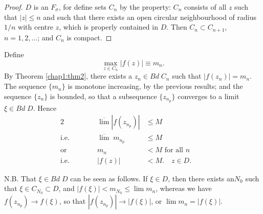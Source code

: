 \begin{proof}
$D$ is an $F_\sigma$, for define sets $C_n$ by the property: $C_n$
  consists of all $z$ such that $|z| \leq n$ and such that there
  exists an open circular neighbourhood of radius $1/n$ with centre
  $z$, which is properly contained in $D$. Then $C_n \subset C_{n+1}$,
  $n=1,2,\ldots$; and $C_n$ is compact.
\end{proof}

Define
$$
\max\limits_{z\in C_n} |f(z)| \equiv m_n.
$$
By Theorem \ref{chap1:thm2}, there exists a $z_n \in Bd \; C_n$ such that $|f(z_n)| =
m_n$. The sequence $\{m_n\}$ is monotone increasing, by the previous
results; and the sequence $\{z_n\}$ is bounded, so that a subsequence
$\{z_{n_p}\}$ converges to a limit $\xi \in Bd \; D$. Hence
\begin{alignat*}{2}
&& \overline{\lim} |f(z_{n_p})| &\leq M\\
\text{i.e.} \qquad &&\overline{\lim} \;  m_{n_p} &\leq M \qquad \\
\text{or~ } \qquad &&m_n &< M \text{ for all } n \qquad \\
\text{i.e.} \qquad &&|f(z)| &< M. \quad z \in D. \qquad 
\end{alignat*}

N.B. That $\xi \in  Bd \; D$ can be seen as follows. If $\xi \in D$,
then there exists an\pageoriginale $N_0$ such that $\xi \in C_{N_0}
\subset D$, and $|f(\xi)| < m_{N_0} \leq \lim m_n$, whereas we have
$f(z_{n_p}) \to f(\xi)$, so that $|f(z_{n_p})| \to |f(\xi)|$, or $\lim
m_n = |f(\xi)|$.

